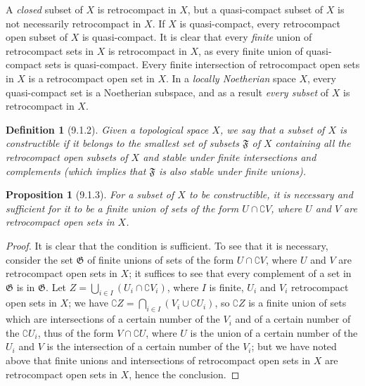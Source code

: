 \documentclass[oneside]{amsart}
\theoremstyle{ega-env-style}
\theoremstyle{ega-thm-env-style}
\newtheorem*{proposition}{Proposition}
\theoremstyle{ega-defn-env-style}
\newtheorem*{definition}{Definition}
\newcommand{\oldpage}[2][]{{\marginnote{\normalfont{\textbf{#1}~|~#2}}}\ignorespaces}
\let\EGAOriginalLabel\label
\renewcommand{\label}[1]{\phantomsection\EGAOriginalLabel{#1}}
\begin{document}
A \emph{closed} subset of $X$ is retrocompact in $X$, but a quasi-compact subset of $X$ is not necessarily retrocompact in $X$.
If $X$ is quasi-compact, every retrocompact open subset of $X$ is quasi-compact.
It is clear that every \emph{finite} union of retrocompact sets in $X$ is retrocompact in $X$, as every finite union of quasi-compact sets is quasi-compact.
Every finite intersection of retrocompact open sets in $X$ is a retrocompact open set in $X$.
In a \emph{locally Noetherian} space $X$, every quasi-compact set is a Noetherian subspace, and as a result \emph{every subset} of $X$ is retrocompact in $X$.

\begin{definition}[9.1.2]
\label{0.9.1.2}
Given a topological space $X$, we say that a subset of $X$ is \emph{constructible} if it belongs to the smallest set of subsets $\mathfrak{F}$ of $X$ containing all the retrocompact open subsets of $X$ and stable under finite intersections and complements (which implies that $\mathfrak{F}$ is also stable under finite unions).
\end{definition}

\begin{proposition}[9.1.3]
\label{0.9.1.3}
For a subset of $X$ to be constructible, it is necessary and sufficient for it to be a finite union of sets of the form $U\cap\complement{V}$, where $U$ and $V$ are retrocompact open sets in $X$.
\end{proposition}

\begin{proof}
It is clear that the condition is sufficient.
To see that it is necessary, consider the set $\mathfrak{G}$ of finite unions of sets of the form $U\cap\complement{V}$, where $U$ and $V$ are retrocompact open sets in $X$; it suffices to see that every complement of a set in $\mathfrak{G}$ is in $\mathfrak{G}$.
Let $Z=\bigcup_{i\in I}(U_i\cap\complement{V_i})$, where $I$ is finite, $U_i$ and $V_i$ retrocompact open sets in $X$; we have
$\complement{Z}=\bigcap_{i\in I}(V_i\cup\complement{U_i})$, so $\complement{Z}$ is a finite union of sets which are intersections of a certain number of the $V_i$ and of a certain number of the $\complement{U_i}$, thus of the form
\oldpage[0\textsubscript{III}]{13}
$V\cap\complement{U}$, where $U$ is the union of a certain number of the $U_i$ and $V$ is the intersection of a certain number of the $V_i$; but we have noted above that finite unions and intersections of retrocompact open sets in $X$ are retrocompact open sets in $X$, hence the conclusion.
\end{proof}
\end{document}
